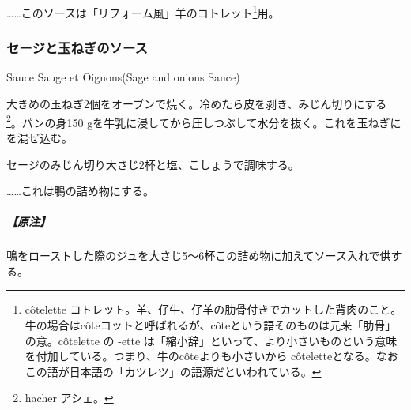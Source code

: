 \begin{recette}
\ldots{}\ldots{}このソースは「リフォーム風」羊のコトレット\footnote{côtelette
  コトレット。羊、仔牛、仔羊の肋骨付きでカットした背肉のこと。牛の場合はcôteコットと呼ばれるが、côteという語そのものは元来「肋骨」の意。côtelette
  の -ette
  は「縮小辞」といって、より小さいものという意味を付加している。つまり、牛のcôteよりも小さいから
  côteletteとなる。なおこの語が日本語の「カツレツ」の語源だといわれている。}用。

\atoaki{}

\hypertarget{sage-and-onions-sauce}{%
\subsubsection{セージと玉ねぎのソース}\label{sage-and-onions-sauce}}

\begin{frsubenv}

Sauce Sauge et Oignons\hspace{1em}\normalfont(Sage and onions Sauce)

\end{frsubenv}


大きめの玉ねぎ2個をオーブンで焼く。冷めたら皮を剥き、みじん切りにする
\footnote{hacher アシェ。}。パンの身150
gを牛乳に浸してから圧しつぶして水分を抜く。これを玉ねぎにを混ぜ込む。

セージのみじん切り大さじ2杯と塩、こしょうで調味する。

\ldots{}\ldots{}これは鴨の詰め物にする。

\hypertarget{nota-sage-and-onions-sauce}{%
\subparagraph{【原注】}\label{nota-sage-and-onions-sauce}}

鴨をローストした際のジュを大さじ5〜6杯この詰め物に加えてソース入れで供する。


\end{recette}
